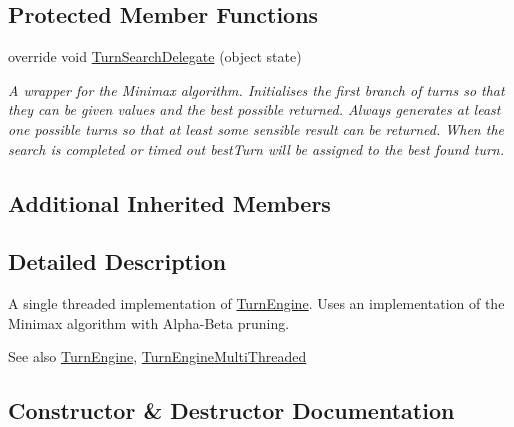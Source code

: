 \subsection*{Protected Member Functions}
\begin{DoxyCompactItemize}
\item 
override void \hyperlink{class_universal_turn_based_a_i_1_1_turn_engine_single_threaded_a2ae467b6b27ec5e2dfe1d033c86ea4d8}{Turn\+Search\+Delegate} (object state)
\begin{DoxyCompactList}\small\item\em A wrapper for the Minimax algorithm. Initialises the first branch of turns so that they can be given values and the best possible returned. Always generates at least one possible turns so that at least some sensible result can be returned. When the search is completed or timed out best\+Turn will be assigned to the best found turn. \end{DoxyCompactList}\end{DoxyCompactItemize}
\subsection*{Additional Inherited Members}


\subsection{Detailed Description}
A single threaded implementation of \hyperlink{class_universal_turn_based_a_i_1_1_turn_engine}{Turn\+Engine}. Uses an implementation of the Minimax algorithm with Alpha-\/\+Beta pruning. 

\begin{DoxySeeAlso}{See also}
\hyperlink{class_universal_turn_based_a_i_1_1_turn_engine}{Turn\+Engine}, \hyperlink{class_universal_turn_based_a_i_1_1_turn_engine_multi_threaded}{Turn\+Engine\+Multi\+Threaded}


\end{DoxySeeAlso}


\subsection{Constructor \& Destructor Documentation}
\hypertarget{class_universal_turn_based_a_i_1_1_turn_engine_single_threaded_a4b4e3d37f9646bf0f5bceb64d1ea560b}{}
